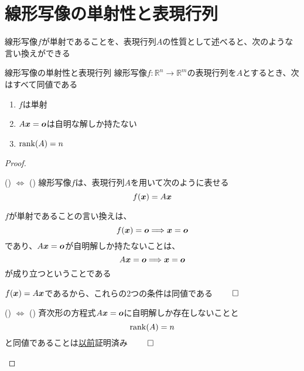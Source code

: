 \documentclass[../../../topic_linear-algebra]{subfiles}
\begin{document}
\sectionline
\section{線形写像の単射性と表現行列}

線形写像$f$が単射であることを、表現行列$A$の性質として述べると、次のような言い換えができる

\begin{theorem}{線形写像の単射性と表現行列}
  線形写像$f\colon \mathbb{R}^n \to \mathbb{R}^m$の表現行列を$A$とするとき、次はすべて同値である
  \begin{enumerate}[label=\romanlabel]
    \item $f$は単射
    \item $A\vb*{x} = \vb*{o}$は自明な解しか持たない
    \item $\rank(A) = n$
  \end{enumerate}
\end{theorem}

\begin{proof}
  \begin{subpattern}{() $\Longleftrightarrow$ ()}
    線形写像$f$は、表現行列$A$を用いて次のように表せる
    \begin{equation*}
      f(\vb*{x}) = A\vb*{x}
    \end{equation*}

    $f$が単射であることの言い換えは、
    \begin{equation*}
      f(\vb*{x}) = \vb*{o} \Longrightarrow \vb*{x} = \vb*{o}
    \end{equation*}
    であり、$A\vb*{x} = \vb*{o}$が自明解しか持たないことは、
    \begin{equation*}
      A\vb*{x} = \vb*{o} \Longrightarrow \vb*{x} = \vb*{o}
    \end{equation*}
    が成り立つということである

    $f(\vb*{x}) = A\vb*{x}$であるから、これらの2つの条件は同値である $\qed$
  \end{subpattern}

  \begin{subpattern}{() $\Longleftrightarrow$ ()}
    斉次形の方程式$A\vb*{x} = \vb*{o}$に自明解しか存在しないことと
    \begin{equation*}
      \rank(A) = n
    \end{equation*}
    と同値であることは\hyperref[thm:homogeneous-trivial-iff-full-col-rank]{以前}証明済み $\qed$
  \end{subpattern}
\end{proof}
\end{document}
